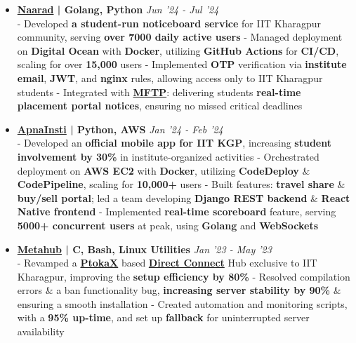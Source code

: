 \documentclass[a4paper,10pt]{extarticle} %
\begin{document}
\begin{itemize}[leftmargin=0.55cm, rightmargin=0.2cm, label={\Large\textbullet}]

 \item \textbf{\href{https://naarad.metakgp.org}{Naarad} | Golang, Python} \hfill{\textit{Jun '24 - Jul '24}} \\
- Developed \textbf{a student-run noticeboard service} for IIT Kharagpur community, serving \textbf{over 7000 daily active users} \newline
- Managed deployment on \textbf{Digital Ocean} with \textbf{Docker}, utilizing \textbf{GitHub Actions} for \textbf{CI/CD}, scaling for over \textbf{15,000} users \newline
- Implemented \textbf{OTP} verification via \textbf{institute email}, \textbf{JWT}, and \textbf{nginx} rules, allowing access only to IIT Kharagpur students \newline
- Integrated with \href{https://github.com/metakgp/mftp}{\textbf{MFTP}}: delivering students \textbf{real-time placement portal notices}, ensuring no missed critical deadlines

 \item \textbf{{\href{https://play.google.com/store/apps/details?id=com.apnainsti&pli=1}{ApnaInsti}} | Python, AWS} \hfill{\textit{Jan '24 - Feb '24}} \\
- Developed an \textbf{official mobile app for IIT KGP}, increasing \textbf{student involvement by 30\%} in institute-organized activities \newline
- Orchestrated deployment on \textbf{AWS EC2} with \textbf{Docker}, utilizing \textbf{CodeDeploy} \& \textbf{CodePipeline}, scaling for \textbf{10,000+} users \newline
- Built features: \textbf{travel share} \& \textbf{buy/sell portal}; led a team developing \textbf{Django REST backend} \& \textbf{React Native frontend} \newline
- Implemented \textbf{real-time scoreboard} feature, serving \textbf{5000+ concurrent users} at peak, using \textbf{Golang} and \textbf{WebSockets}

\item \textbf{{\href{https://github.com/proffapt/Metahub}{Metahub}} | C, Bash, Linux Utilities} \hfill{\textit{Jan '23 - May '23}} \\
- Revamped a \href{http://www.ptokax.org/}{\textbf{PtokaX}} based \href{https://en.wikipedia.org/wiki/Direct_Connect_(protocol)}{\textbf{Direct Connect}} Hub exclusive to IIT Kharagpur, improving the \textbf{setup efficiency by 80\%} \newline
- Resolved compilation errors \& a ban functionality bug, \textbf{increasing server stability by 90\%} \& ensuring a smooth installation \newline
- Created automation and monitoring scripts, with a \textbf{95\% up-time}, and set up \textbf{fallback} for uninterrupted server availability


\end{itemize}
\end{document}
